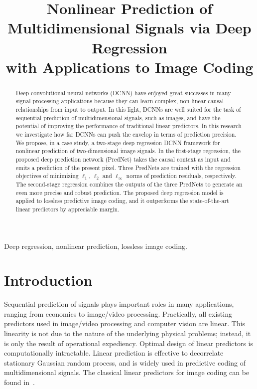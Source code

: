 \documentclass{article}
\title{Nonlinear Prediction of Multidimensional Signals via Deep Regression \\
		 with Applications to Image Coding}
\begin{document}
\maketitle
\begin{abstract}
Deep convolutional neural networks (DCNN) have enjoyed great successes in many signal processing applications because they can learn complex, non-linear causal relationships from input to output.  In this light, DCNNs are well suited for the task of sequential prediction of multidimensional signals, such as images, and have the potential of improving the performance of traditional linear predictors.  In this research we investigate how far DCNNs can push the envelop in terms of prediction precision.  We propose, in a case study, a two-stage deep regression DCNN framework for nonlinear prediction of two-dimensional image signals.  In the first-stage regression, the proposed deep prediction network (PredNet) takes the causal context as input and emits a prediction of the present pixel.  Three PredNets are trained with the regression objectives of minimizing $\ell_1$, $\ell_2$ and $\ell_\infty$ norms of prediction residuals, respectively.
The second-stage regression combines the outputs of the three PredNets to generate an even more precise and robust prediction.
The proposed deep regression model is applied to lossless predictive image coding, and it outperforms the state-of-the-art linear predictors by appreciable margin.
\end{abstract}
\begin{keywords}
Deep regression, nonlinear prediction, lossless image coding.
\end{keywords}
\section{Introduction}


Sequential prediction of signals plays important roles in many applications, ranging from economics to image/video processing.  Practically, all existing predictors used in image/video processing and computer vision are linear.  This linearity is not due to the nature of the underlying physical problems; instead, it is only the result of operational expediency.  Optimal design of linear predictors is computationally intractable.
Linear prediction is effective to decorrelate stationary Gaussian random process, and is widely used in predictive coding of multidimensional signals. The classical linear predictors for image coding can be found in~\cite{wu1998,li2001,takeda2006,kervrann2008,memon2000,akimov2007}.
\end{document}
